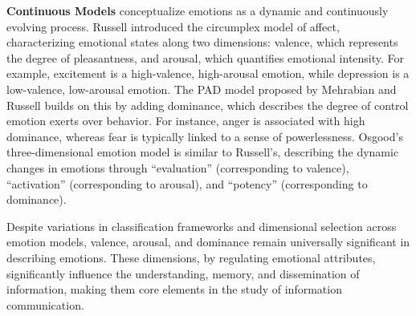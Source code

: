 
\textbf{Continuous Models} conceptualize emotions as a dynamic and continuously evolving process. Russell \cite{russell1980circumplex} introduced the circumplex model of affect, characterizing emotional states along two dimensions: valence, which represents the degree of pleasantness, and arousal, which quantifies emotional intensity. For example, excitement is a high-valence, high-arousal emotion, while depression is a low-valence, low-arousal emotion. The PAD model proposed by Mehrabian and Russell \cite{mehrabian1974approach} builds on this by adding dominance, which describes the degree of control emotion exerts over behavior. For instance, anger is associated with high dominance, whereas fear is typically linked to a sense of powerlessness. Osgood’s \cite{osgood1952nature} three-dimensional emotion model is similar to Russell's, describing the dynamic changes in emotions through “evaluation” (corresponding to valence), “activation” (corresponding to arousal), and “potency” (corresponding to dominance).



Despite variations in classification frameworks and dimensional selection across emotion models, valence, arousal, and dominance remain universally significant in describing emotions. These dimensions, by regulating emotional attributes, significantly influence the understanding, memory, and dissemination of information, making them core elements in the study of information communication.

